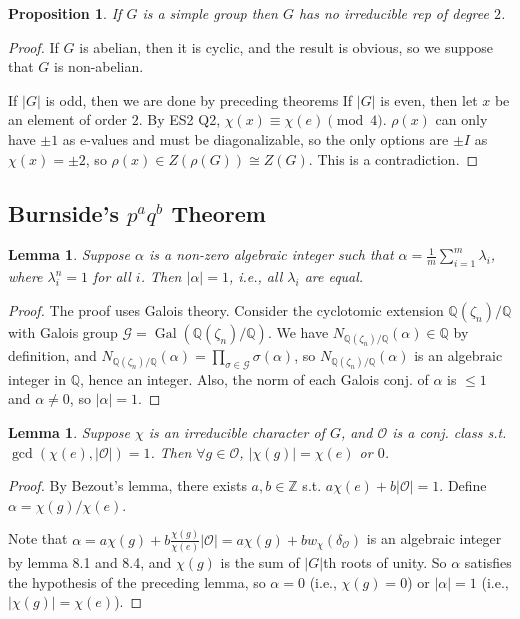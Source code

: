 \documentclass{article}
\theoremstyle{definition}
\theoremstyle{remark}
\theoremstyle{plain}
\newtheorem{lem}[defn]{Lemma}
\newtheorem{prop}[defn]{Proposition}
\newcommand{\ZZ}{\mathbb{Z}}
\newcommand{\QQ}{\mathbb{Q}}
\begin{document}
\begin{prop}
    If $G$ is a simple group then $G$ has no irreducible rep of degree $2$.
\end{prop}
\begin{proof}
    If $G$ is abelian, then it is cyclic, and the result is obvious, so we suppose that $G$ is non-abelian.

    If $|G|$ is odd, then we are done by preceding theorems
    If $|G|$ is even, then let $x$ be an element of order $2$. By ES2 Q2, $\chi(x)\equiv \chi(e)\pmod 4$. $\rho(x)$ can only have $\pm 1$ as e-values and must be diagonalizable, so the only options are $\pm I$ as $\chi(x)=\pm 2$, so $\rho(x)\in Z(\rho(G))\cong Z(G)$. This is a contradiction.
\end{proof}

\subsection{Burnside's $p^aq^b$ Theorem}
\begin{lem}
Suppose $\alpha$ is a non-zero algebraic integer such that $\alpha=\frac{1}{m}\sum_{i=1}^m\lambda_i$, where $\lambda_i^n=1$ for all $i$. Then $|\alpha|=1$, i.e., all $\lambda_i$ are equal.
\end{lem}
\begin{proof}
    The proof uses Galois theory. Consider the cyclotomic extension $\QQ(\zeta_n)/\QQ$ with Galois group $\mathcal G=\operatorname{Gal}(\QQ(\zeta_n)/\QQ)$. We have $N_{\QQ(\zeta_n)/\QQ}(\alpha)\in\QQ$ by definition, and $N_{\QQ(\zeta_n)/\QQ}(\alpha)=\prod_{\sigma\in\mathcal G}\sigma(\alpha)$, so $N_{\QQ(\zeta_n)/\QQ}(\alpha)$ is an algebraic integer in $\QQ$, hence an integer. Also, the norm of each Galois conj. of $\alpha$ is $\le 1$ and $\alpha\neq0$, so $|\alpha|=1$.
\end{proof}
\begin{lem}
    Suppose $\chi$ is an irreducible character of $G$, and $\mathcal O$ is a conj. class s.t. $\gcd(\chi(e),|\mathcal O|)=1$. Then $\forall g\in \mathcal O$, $|\chi(g)|=\chi(e)$ or $0$.
\end{lem}
\begin{proof}
    By Bezout's lemma, there exists $a,b\in\ZZ$ s.t. $a\chi(e)+b|\mathcal O|=1$. Define $\alpha=\chi(g)/\chi(e)$.

    Note that $\alpha=a\chi(g)+b\frac{\chi(g)}{\chi(e)}|\mathcal{O}|=a\chi(g)+bw_\chi(\delta_{\mathcal O})$ is an algebraic integer by lemma 8.1 and 8.4, and $\chi(g)$ is the sum of $|G|$th roots of unity. So $\alpha$ satisfies the hypothesis of the preceding lemma, so $\alpha=0$ (i.e., $\chi(g)=0$) or $|\alpha|=1$ (i.e., $|\chi(g)|=\chi(e)$).
\end{proof}
\end{document}
